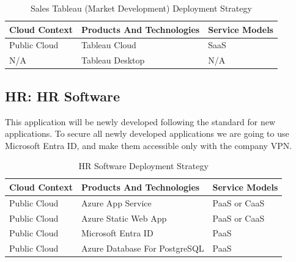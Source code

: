 \documentclass{llncs}
\begin{document}
\begin{table}[h!]
    \centering
    \begin{tabular}{lll}
        \hline
        \textbf{Cloud Context} & \textbf{Products And Technologies} & \textbf{Service Models} \\
        \hline
 Public Cloud           & Tableau Cloud                      & SaaS                    \\
 N/A                    & Tableau Desktop                    & N/A                     \\
    \end{tabular}
    \caption{Sales Tableau (Market Development) Deployment Strategy}
\end{table}

\subsection{HR: HR Software}
This application will be newly developed following the standard for new applications.
To secure all newly developed applications we are going to use Microsoft Entra ID, and make them accessible only with the company VPN.\\

\begin{table}[h!]
    \centering
    \begin{tabular}{lll}
        \hline
        \textbf{Cloud Context} & \textbf{Products And Technologies} & \textbf{Service Models} \\
        \hline
 Public Cloud           & Azure App Service                  & PaaS or CaaS            \\
        \hline
 Public Cloud           & Azure Static Web App               & PaaS or CaaS            \\

        \hline
 Public Cloud           & Microsoft Entra ID                 & PaaS                    \\
        \hline
 Public Cloud           & Azure Database For PostgreSQL      & PaaS                    \\
        \hline
    \end{tabular}
    \caption{HR Software Deployment Strategy}
\end{table}
\end{document}
